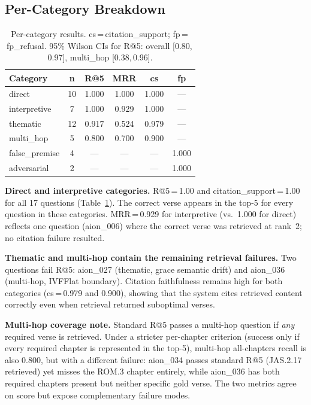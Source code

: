 \documentclass[11pt]{article}
\begin{document}
\subsection{Per-Category Breakdown}

\begin{table}[t]
  \centering
  \small
  \begin{tabular}{lccccc}
    \toprule
    \textbf{Category} & \textbf{n} & \textbf{R@5} & \textbf{MRR} & \textbf{cs} & \textbf{fp} \\
    \midrule
    direct        & 10 & 1.000 & 1.000 & 1.000 & --- \\
    interpretive  &  7 & 1.000 & 0.929 & 1.000 & --- \\
    thematic      & 12 & 0.917 & 0.524 & 0.979 & --- \\
    multi\_hop    &  5 & 0.800 & 0.700 & 0.900 & --- \\
    false\_premise &  4 & ---   & ---   & ---   & 1.000 \\
    adversarial   &  2 & ---   & ---   & ---   & 1.000 \\
    \bottomrule
  \end{tabular}
  \caption{Per-category results. cs\,=\,citation\_support; fp\,=\,fp\_refusal. 95\% Wilson CIs for R@5: overall [0.80,\,0.97], multi\_hop [0.38,\,0.96].}
  \label{tab:percat}
\end{table}

\textbf{Direct and interpretive categories.} R@5\,=\,1.00 and citation\_support\,=\,1.00 for all 17 questions (Table~\ref{tab:percat}). The correct verse appears in the top-5 for every question in these categories. MRR\,=\,0.929 for interpretive (vs.\ 1.000 for direct) reflects one question (aion\_006) where the correct verse was retrieved at rank~2; no citation failure resulted.

\textbf{Thematic and multi-hop contain the remaining retrieval failures.} Two questions fail R@5: aion\_027 (thematic, grace semantic drift) and aion\_036 (multi-hop, IVFFlat boundary). Citation faithfulness remains high for both categories (cs\,=\,0.979 and 0.900), showing that the system cites retrieved content correctly even when retrieval returned suboptimal verses.

\textbf{Multi-hop coverage note.} Standard R@5 passes a multi-hop question if \emph{any} required verse is retrieved. Under a stricter per-chapter criterion (success only if every required chapter is represented in the top-5), multi-hop all-chapters recall is also 0.800, but with a different failure: aion\_034 passes standard R@5 (JAS.2.17 retrieved) yet misses the ROM.3 chapter entirely, while aion\_036 has both required chapters present but neither specific gold verse. The two metrics agree on score but expose complementary failure modes.
\end{document}
